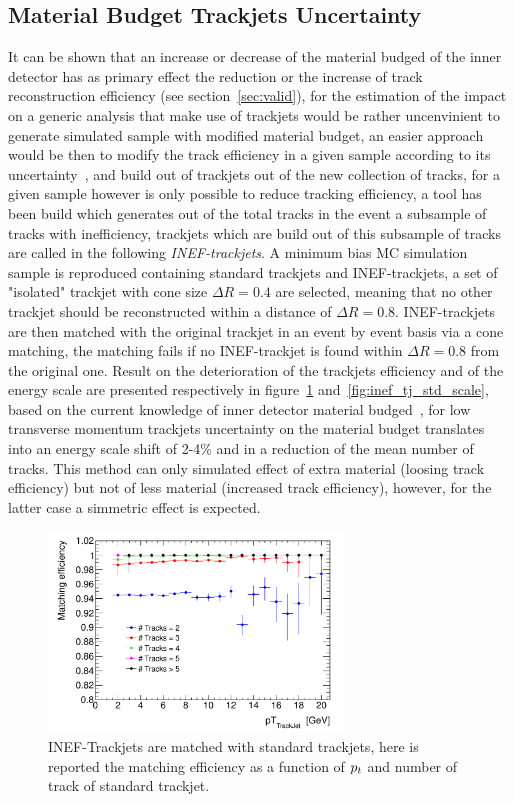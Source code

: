 \subsection{Material Budget Trackjets Uncertainty} \label{sec:trackExMat} %
It can be shown that an increase or decrease of the material budged of the inner detector has as primary
effect the reduction or the increase of track reconstruction efficiency (see section~\ref{sec:valid}), 
for the estimation of the impact on a generic analysis that make use of trackjets would be rather uncenvinient 
to generate simulated sample with modified material budget, an easier approach would be then to
modify the track efficiency in a given sample according to its uncertainty~\cite{IDMaterial,trackEff}, and build 
out of trackjets out of the new collection of tracks, for a given sample however is only possible to reduce 
tracking efficiency, a tool has been build which generates out of the total tracks in the event a subsample
of tracks with inefficiency, trackjets which are build out of this subsample of tracks are called in the
following \emph{INEF-trackjets}. A minimum bias MC simulation sample is reproduced containing standard 
trackjets and INEF-trackjets, a set of "isolated" trackjet with cone size $\Delta R = 0.4$ are selected, meaning that no other trackjet 
should be reconstructed within a distance of $\Delta R = 0.8$. INEF-trackjets are then matched with the original trackjet
in an event by event basis via a cone matching, the matching fails if no INEF-trackjet is found within $\Delta R = 0.8$ from
the original one. Result on the deterioration of the trackjets efficiency and of the energy scale are presented respectively in 
figure~\ref{fig:inef_tj_std_eff} and~\ref{fig:inef_tj_std_scale}, based on the current knowledge of inner detector 
material budged~\cite{IDMaterial}, for low transverse momentum trackjets uncertainty on the material budget 
translates into an energy scale shift of 2-4\% and in a reduction of the mean number of tracks.
This method can only simulated effect of extra material (loosing track efficiency) but not of less material
(increased track efficiency), however, for the latter case a simmetric effect is expected.


\begin{figure}[tp]
\centering
\includegraphics[width=0.7\textwidth]{figure/trackjet/T7/Sys_eff_n.pdf}
\caption{INEF-Trackjets are matched with standard trackjets, here is reported the matching efficiency as a function of 
	$p_{t}$ and number of track of standard trackjet.}

\label{fig:inef_tj_std_eff}
\end{figure}    


